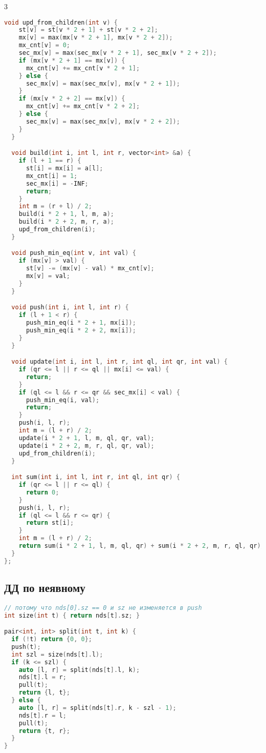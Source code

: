 \documentclass[9pt,a4paper,landscape,twosided]{extarticle}
\begin{document}
\begin{multicols*}{3}
\begin{lstlisting}[language=C++]
  void upd_from_children(int v) {
    st[v] = st[v * 2 + 1] + st[v * 2 + 2];
    mx[v] = max(mx[v * 2 + 1], mx[v * 2 + 2]);
    mx_cnt[v] = 0;
    sec_mx[v] = max(sec_mx[v * 2 + 1], sec_mx[v * 2 + 2]);
    if (mx[v * 2 + 1] == mx[v]) {
      mx_cnt[v] += mx_cnt[v * 2 + 1];
    } else {
      sec_mx[v] = max(sec_mx[v], mx[v * 2 + 1]);
    }
    if (mx[v * 2 + 2] == mx[v]) {
      mx_cnt[v] += mx_cnt[v * 2 + 2];
    } else {
      sec_mx[v] = max(sec_mx[v], mx[v * 2 + 2]);
    }
  }

  void build(int i, int l, int r, vector<int> &a) {
    if (l + 1 == r) {
      st[i] = mx[i] = a[l];
      mx_cnt[i] = 1;
      sec_mx[i] = -INF;
      return;
    }
    int m = (r + l) / 2;
    build(i * 2 + 1, l, m, a);
    build(i * 2 + 2, m, r, a);
    upd_from_children(i);
  }

  void push_min_eq(int v, int val) {
    if (mx[v] > val) {
      st[v] -= (mx[v] - val) * mx_cnt[v];
      mx[v] = val;
    }
  }

  void push(int i, int l, int r) {
    if (l + 1 < r) {
      push_min_eq(i * 2 + 1, mx[i]);
      push_min_eq(i * 2 + 2, mx[i]);
    }
  }

  void update(int i, int l, int r, int ql, int qr, int val) {
    if (qr <= l || r <= ql || mx[i] <= val) {
      return;
    }
    if (ql <= l && r <= qr && sec_mx[i] < val) {
      push_min_eq(i, val);
      return;
    }
    push(i, l, r);
    int m = (l + r) / 2;
    update(i * 2 + 1, l, m, ql, qr, val);
    update(i * 2 + 2, m, r, ql, qr, val);
    upd_from_children(i);
  }

  int sum(int i, int l, int r, int ql, int qr) {
    if (qr <= l || r <= ql) {
      return 0;
    }
    push(i, l, r);
    if (ql <= l && r <= qr) {
      return st[i];
    }
    int m = (l + r) / 2;
    return sum(i * 2 + 1, l, m, ql, qr) + sum(i * 2 + 2, m, r, ql, qr);
  }
};
\end{lstlisting}

\subsection{ДД по неявному}
\begin{lstlisting}[language=C++]
// потому что nds[0].sz == 0 и sz не изменяется в push
int size(int t) { return nds[t].sz; }

pair<int, int> split(int t, int k) {
  if (!t) return {0, 0};
  push(t);
  int szl = size(nds[t].l);
  if (k <= szl) {
    auto [l, r] = split(nds[t].l, k);
    nds[t].l = r;
    pull(t);
    return {l, t};
  } else {
    auto [l, r] = split(nds[t].r, k - szl - 1);
    nds[t].r = l;
    pull(t);
    return {t, r};
  }
}


\end{lstlisting}
\end{multicols*}
\end{document}
